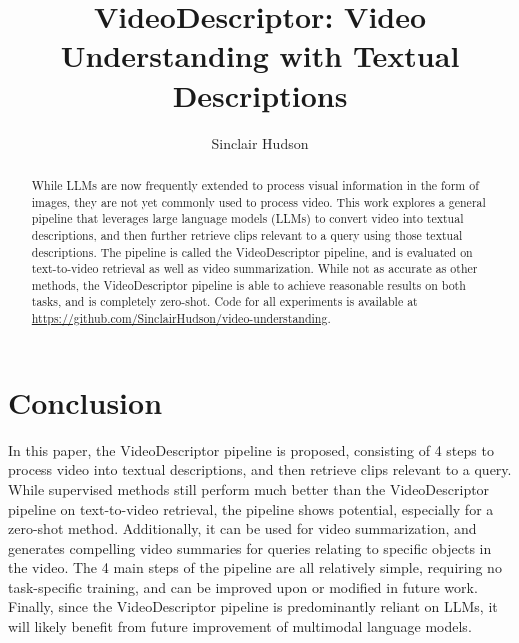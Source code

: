 \documentclass{article}
\title{VideoDescriptor: Video Understanding with Textual Descriptions}
\author{Sinclair Hudson}
\begin{document}
\maketitle

\begin{abstract}
      While LLMs are now frequently extended to process visual information in the form of images, they are not yet commonly used to process video.
      This work explores a general pipeline that leverages large language models (LLMs) to convert video into textual descriptions, and then further retrieve clips relevant to a query using those textual descriptions.
      The pipeline is called the VideoDescriptor pipeline, and is evaluated on text-to-video retrieval as well as video summarization.
      While not as accurate as other methods, the VideoDescriptor pipeline is able to achieve reasonable results on both tasks, and is completely zero-shot.
      Code for all experiments is available at \url{https://github.com/SinclairHudson/video-understanding}.
\end{abstract}













\section{Conclusion}

In this paper, the VideoDescriptor pipeline is proposed, consisting of 4 steps to process video into textual descriptions, and then retrieve clips relevant to a query.
While supervised methods still perform much better than the VideoDescriptor pipeline on text-to-video retrieval, the pipeline shows potential, especially for a zero-shot method.
Additionally, it can be used for video summarization, and generates compelling video summaries for queries relating to specific objects in the video.
The 4 main steps of the pipeline are all relatively simple, requiring no task-specific training, and can be improved upon or modified in future work.
Finally, since the VideoDescriptor pipeline is predominantly reliant on LLMs, it will likely benefit from future improvement of multimodal language models.



\end{document}
